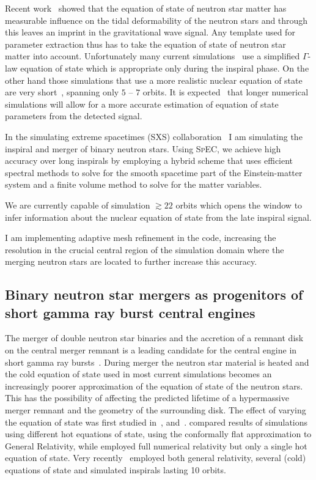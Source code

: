 \documentclass[12pt]{article}
\newcommand{\code}[1]{\textsc{#1}}
\begin{document}
Recent work~\cite{Hinderer:2009ca,Read:2009yp} showed that the equation of
state of neutron star
matter has measurable influence on the tidal deformability of the neutron
stars and through this leaves an imprint in the gravitational wave signal.
Any template used for parameter extraction thus has to take the 
equation of state of neutron star matter into account. 
Unfortunately many current simulations~\cite{Bernuzzi:2012ci,
Giacomazzo:2010bx,Baiotti:2011am,East:2012ww,Foucart:2012vn,Haas:nsns}
use
a simplified $\Gamma$-law equation of state which is appropriate only during
the inspiral phase. On the other hand those simulations that use a more realistic
nuclear equation of state are very
short~\cite{Hotokezaka:2011dh}, spanning only $5$ -- $7$ orbits.
It is expected~\cite{Read:2009yp} that longer numerical simulations will allow
for a more accurate estimation of equation of state parameters from the
detected signal.

In the simulating extreme spacetimes (SXS) collaboration~\cite{SXS:web}
I am simulating the inspiral and merger of binary neutron
stars.
Using \code{SpEC}, we achieve high accuracy over long inspirals 
by employing a hybrid scheme
that uses efficient spectral methods to solve for the smooth spacetime part of
the Einstein-matter system and a finite volume method to solve for the matter
variables.

We are currently capable of simulation $\gtrsim 22$ orbits which opens the
window to infer information about the nuclear equation of state from the late
inspiral signal.

I am implementing
adaptive mesh refinement in the code, increasing the resolution in the crucial
central region of the simulation
domain where the merging neutron stars are located to further increase this
accuracy.

\subsection{Binary neutron star mergers as progenitors of short gamma ray burst
central engines} 
The merger of double neutron star binaries and the accretion of a remnant disk
on the central merger remnant is a leading
candidate for the central engine in short gamma ray
bursts~\cite{Tauris:2003pf}.
During merger the
neutron star material is heated and the cold equation of state 
used in most current simulations becomes an increasingly poorer approximation
of the equation of state of the neutron stars.
This has the
possibility of affecting the predicted lifetime of a hypermassive merger remnant and the
geometry of the surrounding disk. The effect of varying the equation of state 
was first studied
in~\cite{Oechslin:2006uk}, \cite{Sekiguchi:2011zd}
and~\cite{Hotokezaka:2013mm}.
\cite{Oechslin:2006uk} compared results of simulations using different hot
equations of state, using the conformally flat
approximation to General Relativity, while \cite{Sekiguchi:2011zd} employed
full numerical relativity but only a single hot equation of
state. Very recently~\cite{Hotokezaka:2013mm} employed both general
relativity, several (cold) equations of state and simulated inspirals lasting
10 orbits.
\end{document}
